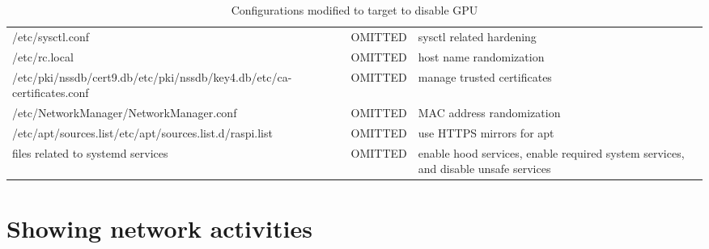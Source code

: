 \documentclass[mscthesis]{usiinfthesis}
\begin{document}
\begin{landscape}
\begin{table}[H]
\begin{tabular}{|p{70mm}|p{40mm}|p{80mm}|}
      /etc/sysctl.conf                                                                         & OMITTED                                                                                                             & sysctl related hardening                                                           \\
      /etc/rc.local                                                                            & OMITTED                                                                                                             & host name randomization                                                            \\
      /etc/pki/nssdb/cert9.db\newline /etc/pki/nssdb/key4.db\newline /etc/ca-certificates.conf & OMITTED                                                                                                             & manage trusted certificates                                                        \\
      /etc/NetworkManager/NetworkManager.conf                                                  & OMITTED                                                                                                             & MAC address randomization                                                          \\
      /etc/apt/sources.list\newline /etc/apt/sources.list.d/raspi.list                         & OMITTED                                                                                                             & use HTTPS mirrors for apt                                                          \\
      files related to systemd services                                                        & OMITTED                                                                                                             & enable hood services, enable required system services, and disable unsafe services \\
      \hline
    \end{tabular}
    \caption{Configurations modified to target to disable GPU}
    \label{tab:other_config}
  \end{table}
\end{landscape}


\chapter{Showing network activities}\label{cha:show}
\end{document}
